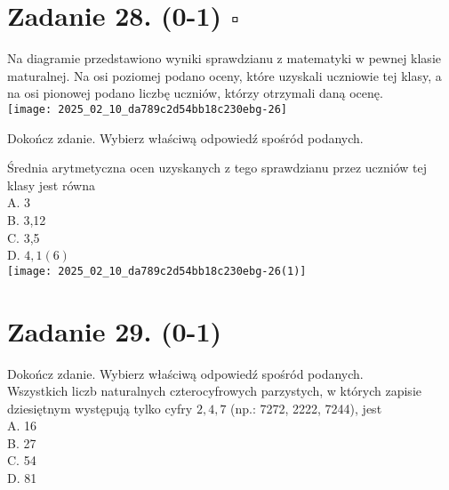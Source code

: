 \documentclass[10pt]{article}
\begin{document}
\section*{Zadanie 28. (0-1) \(\square\)}
Na diagramie przedstawiono wyniki sprawdzianu z matematyki w pewnej klasie maturalnej. Na osi poziomej podano oceny, które uzyskali uczniowie tej klasy, a na osi pionowej podano liczbę uczniów, którzy otrzymali daną ocenę.\\
\texttt{[image: 2025\_02\_10\_da789c2d54bb18c230ebg-26]}

Dokończ zdanie. Wybierz właściwą odpowiedź spośród podanych.

Średnia arytmetyczna ocen uzyskanych z tego sprawdzianu przez uczniów tej klasy jest równa\\
A. 3\\
B. 3,12\\
C. 3,5\\
D. \(4,1(6)\)\\
\texttt{[image: 2025\_02\_10\_da789c2d54bb18c230ebg-26(1)]}

\section*{Zadanie 29. (0-1)}
Dokończ zdanie. Wybierz właściwą odpowiedź spośród podanych.\\
Wszystkich liczb naturalnych czterocyfrowych parzystych, w których zapisie dziesiętnym występują tylko cyfry \(2,4,7\) (np.: 7272, 2222, 7244), jest\\
A. 16\\
B. 27\\
C. 54\\
D. 81
\end{document}
